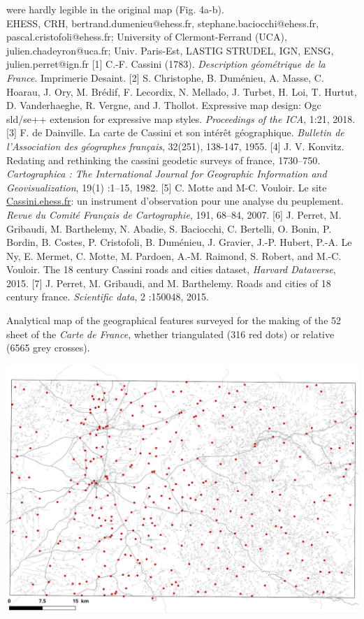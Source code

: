 \documentclass[portrait,a0]{sciposter}
\begin{document}
\begin{minipage}[b]{\textwidth}
\begin{multicols}{3}
were hardly legible in the original map (Fig. 4a-b).\\
    \vfill
    \small
     EHESS, CRH, bertrand.dumenieu@ehess.fr, stephane.baciocchi@ehess.fr, pascal.cristofoli@ehess.fr;  University of Clermont-Ferrand (UCA), julien.chadeyron@uca.fr;  Univ. Paris-Est, LASTIG STRUDEL, IGN, ENSG, julien.perret@ign.fr
    \vfill
    [1] C.-F. Cassini (1783). \textit{Description géométrique de la France}. Imprimerie Desaint.
    [2] S. Christophe, B. Duménieu, A. Masse, C. Hoarau, J. Ory, M. Brédif, F. Lecordix, N. Mellado, J. Turbet, H. Loi, T. Hurtut, D. Vanderhaeghe, R. Vergne, and J. Thollot. Expressive map design: Ogc sld/se++ extension for expressive map styles. \textit{Proceedings of the ICA}, 1:21, 2018.
    [3] F. de Dainville. La carte de Cassini et son intérêt géographique. \textit{Bulletin de l'Association des géographes français}, 32(251), 138-147, 1955.
    [4] J. V. Konvitz. Redating and rethinking the cassini geodetic surveys of france, 1730–750. \textit{Cartographica : The International Journal for Geographic Information and Geovisualization}, 19(1) :1–15, 1982.
    [5] C. Motte and M-C. Vouloir. Le site \href{http://cassini.ehess.fr}{Cassini.ehess.fr}: un instrument d’observation pour une analyse du peuplement. \textit{Revue du Comité Français de Cartographie}, 191, 68–84, 2007.
    [6] J. Perret, M. Gribaudi, M. Barthelemy, N. Abadie, S. Baciocchi, C. Bertelli, O. Bonin, P. Bordin, B. Costes, P. Cristofoli, B. Duménieu, J. Gravier, J.-P. Hubert, P.-A. Le Ny, E. Mermet, C. Motte, M. Pardoen, A.-M. Raimond, S. Robert, and M.-C. Vouloir. The 18 century Cassini roads and cities dataset, \textit{Harvard Dataverse}, 2015.
    [7] J. Perret, M. Gribaudi, and M. Barthelemy. Roads and cities of 18 century france. \textit{Scientific data}, 2 :150048, 2015.
    \begin{center}
      \captionsetup{type=figure}
      \caption{Analytical map of the geographical features surveyed for the making of the 52 sheet of the \textit{Carte de France}, whether triangulated (316 red dots) or relative (\num{6565} grey crosses).}
      \label{map:triangulated-relative}
      \vspace{-0.5cm}\includegraphics[width=0.95\linewidth,trim= 0cm 0cm 0cm 2cm, clip]{gfx/Triangulated.png}

\end{center}
\end{multicols}
\end{minipage}
\end{document}
